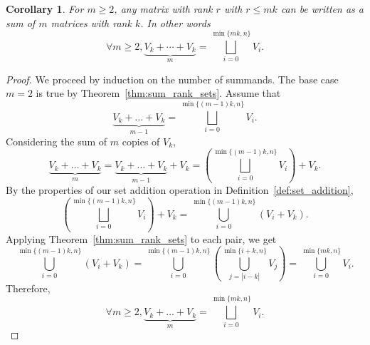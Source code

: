 \documentclass[12pt, a4paper]{amsart}
\newtheorem{cor}[thm]{Corollary}
\theoremstyle{definition}
\numberwithin{equation}{section}
\begin{document}
\begin{cor} \label{cor:multiply}
    For $m \geq 2$, any matrix with rank $r$ with $ r \leq m  k$ can be written as a sum of $m$ matrices with rank $k$. In other words
    \[\forall m \geq 2, \underbrace{V_k + \cdots + V_k}_{m} = \bigsqcup_{i=0}^{\min\{mk, n\}} V_i.\]
\end{cor}
\begin{proof}
    We proceed by induction on the number of summands. The base case $m=2$ is true by Theorem~\ref{thm:sum_rank_sets}. Assume that
    \[ \underbrace{V_k + \ldots + V_k}_{m-1} = \bigsqcup_{i=0}^{\min\{(m-1)k, n\}} V_i.\]
    Considering the sum of $m$ copies of $V_k$,
    \[\underbrace{V_k + \ldots + V_k}_{m} = \underbrace{V_k + \ldots + V_k}_{m-1} + V_k = \left( \bigsqcup_{i=0}^{\min\{(m-1)k, n\}} V_i \right)+ V_k.\]
    By the properties of our set addition operation in Definition~\ref{def:set_addition},
    \[\left( \bigsqcup_{i=0}^{\min\{(m-1)k, n\}} V_i \right)+ V_k = \bigcup_{i=0}^{\min\{(m-1)k, n\}} ( V_i + V_k ).\]
    Applying Theorem~\ref{thm:sum_rank_sets} to each pair, we get
    \[\bigcup_{i=0}^{\min\{(m-1)k, n\}} ( V_i + V_k ) = \bigcup_{i=0}^{\min\{(m-1)k, n\}} \left( \bigcup_{j=|i-k|}^{\min\{i+k, n\}} V_j \right) = \bigcup_{i=0}^{\min\{mk, n\}} V_i.\]
    Therefore,
    \[\forall m \geq 2, \underbrace{V_k + \ldots + V_k}_{m} = \bigsqcup_{i=0}^{\min\{mk, n\}} V_i.\]
\end{proof}
\end{document}

